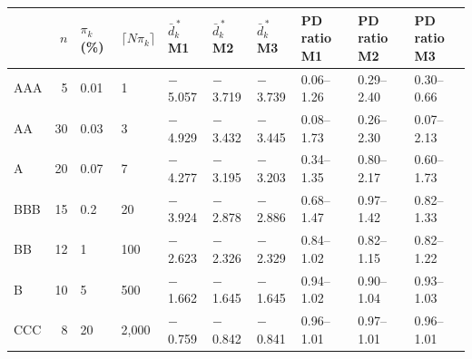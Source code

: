 \begin{tabular}{lrllllllll}
\toprule
 & $n$ & $\pi_k$ (\%) & $\lceil N\pi_k\rceil$ & $\bar d^{\,*}_k$ M1 & $\bar d^{\,*}_k$ M2 & $\bar d^{\,*}_k$ M3 & PD ratio M1 & PD ratio M2 & PD ratio M3 \\
\midrule
AAA & 5 & 0.01 & 1 & $-$5.057 & $-$3.719 & $-$3.739 & 0.06--1.26 & 0.29--2.40 & 0.30--0.66 \\
AA & 30 & 0.03 & 3 & $-$4.929 & $-$3.432 & $-$3.445 & 0.08--1.73 & 0.26--2.30 & 0.07--2.13 \\
A & 20 & 0.07 & 7 & $-$4.277 & $-$3.195 & $-$3.203 & 0.34--1.35 & 0.80--2.17 & 0.60--1.73 \\
BBB & 15 & 0.2 & 20 & $-$3.924 & $-$2.878 & $-$2.886 & 0.68--1.47 & 0.97--1.42 & 0.82--1.33 \\
BB & 12 & 1 & 100 & $-$2.623 & $-$2.326 & $-$2.329 & 0.84--1.02 & 0.82--1.15 & 0.82--1.22 \\
B & 10 & 5 & 500 & $-$1.662 & $-$1.645 & $-$1.645 & 0.94--1.02 & 0.90--1.04 & 0.93--1.03 \\
CCC & 8 & 20 & 2,000 & $-$0.759 & $-$0.842 & $-$0.841 & 0.96--1.01 & 0.97--1.01 & 0.96--1.01 \\
\bottomrule
\end{tabular}
